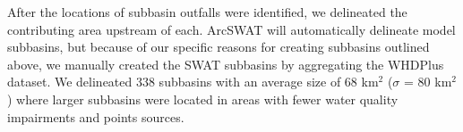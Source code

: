 After the locations of subbasin outfalls were identified, we delineated the contributing area upstream of each.
ArcSWAT will automatically delineate model subbasins, but because of our specific reasons for creating subbasins outlined above, we manually created the SWAT subbasins by aggregating the WHDPlus dataset.
We delineated 338 subbasins with an average size of 68 km$^2$ ($\sigma$ = 80 km$^2$) where larger subbasins were located in areas with fewer water quality impairments and points sources.

